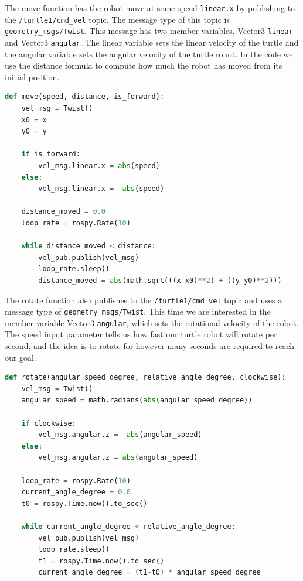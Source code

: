 \documentclass[11pt]{article}
\begin{document}
The move function has the robot move at some speed \texttt{linear.x} by publishing to the \texttt{/turtle1/cmd\_vel} topic. The message type of this topic is \texttt{geometry\_msgs/Twist}. This message has two member variables, Vector3 \texttt{linear} and Vector3 \texttt{angular}. The linear variable sets the linear velocity of the turtle and the angular variable sets the angular velocity of the turtle robot. In the code we use the distance formula to compute how much the robot has moved from its initial position.

\begin{lstlisting}[language=Python]
def move(speed, distance, is_forward):
    vel_msg = Twist()
    x0 = x
    y0 = y

    if is_forward:
        vel_msg.linear.x = abs(speed)
    else:
        vel_msg.linear.x = -abs(speed)

    distance_moved = 0.0
    loop_rate = rospy.Rate(10)

    while distance_moved < distance:
        vel_pub.publish(vel_msg)
        loop_rate.sleep()
        distance_moved = abs(math.sqrt(((x-x0)**2) + ((y-y0)**2)))
\end{lstlisting}

The rotate function also publishes to the \texttt{/turtle1/cmd\_vel} topic and uses a message type of \texttt{geometry\_msgs/Twist}. This time we are interested in the member variable Vector3 \texttt{angular}, which sets the rotational velocity of the robot. The speed input parameter tells us how fast our turtle robot will rotate per second, and the idea is to rotate for however many seconds are required to reach our goal.

\begin{lstlisting}[language=Python]
def rotate(angular_speed_degree, relative_angle_degree, clockwise):
    vel_msg = Twist()
    angular_speed = math.radians(abs(angular_speed_degree))

    if clockwise:
        vel_msg.angular.z = -abs(angular_speed)
    else:
        vel_msg.angular.z = abs(angular_speed)

    loop_rate = rospy.Rate(10)
    current_angle_degree = 0.0
    t0 = rospy.Time.now().to_sec()

    while current_angle_degree < relative_angle_degree:
        vel_pub.publish(vel_msg)
        loop_rate.sleep()
        t1 = rospy.Time.now().to_sec()
        current_angle_degree = (t1-t0) * angular_speed_degree
\end{lstlisting}
\end{document}
